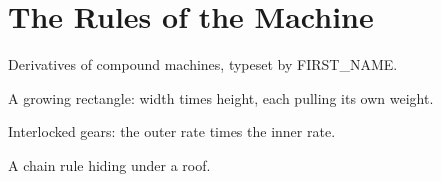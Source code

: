 
\section{The Rules of the Machine}

Derivatives of compound machines, typeset by {{FIRST_NAME}}.

A growing rectangle: width times height, each pulling its own weight.



Interlocked gears: the outer rate times the inner rate.



A chain rule hiding under a roof.


